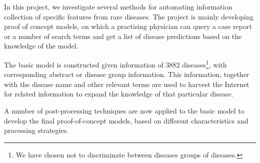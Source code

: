 \documentclass[10pt,letterpaper,two column,final]{article}
\begin{document}

In this project, we investigate several methods for automating
information collection of specific features from rare diseases. The
project is mainly developing proof of concept models, on which a
practising physician can query a case report or a number of search terms
and get a list of disease predictions based on the knowledge of the
model.

The basic model is constructed given information of 3882 diseases\footnote{We have chosen not to discriminate between diseases groups of
diseases.}, with corresponding abstract or disease group information.
This information, together with the disease name and other relevant
terms are used to harvest the Internet for related information to expand
the knowledge of that particular disease.

A number of post-processing techniques are now applied to the basic
model to develop the final proof-of-concept models, based on different
characteristics and processing strategies.



\end{document}
